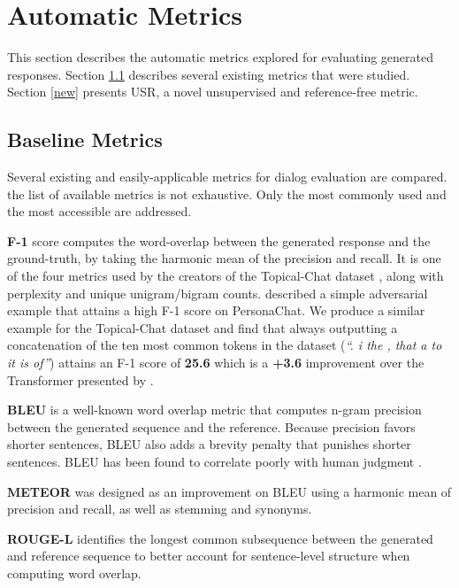 \documentclass[11pt,a4paper]{article}
\begin{document}
\section{Automatic Metrics}
\label{am}
This section describes the automatic metrics explored for evaluating generated responses. Section \ref{baseline} describes several existing metrics that were studied. Section \ref{new} presents USR, a novel unsupervised and reference-free metric. 
\subsection{Baseline Metrics}
\label{baseline}

Several existing and easily-applicable metrics for dialog evaluation are compared. the list of available metrics is not exhaustive. Only the most commonly used and the most accessible are addressed.

\textbf{F-1} score computes the word-overlap between the generated response and the ground-truth, by taking the harmonic mean of the precision and recall. It is one of the four metrics used by the creators of the Topical-Chat dataset \citep{gopalakrishnan2019topical}, along with perplexity and unique unigram/bigram counts. \citet{dinan2019second} described a simple adversarial example that attains a high F-1 score on PersonaChat. We produce a similar example for the Topical-Chat dataset and find that always outputting a concatenation of the ten most common tokens in the dataset (\textit{``. i the , that a to it is of''}) attains an F-1 score of \textbf{25.6} which is a \textbf{+3.6} improvement over the Transformer presented by \citet{gopalakrishnan2019topical}.

\textbf{BLEU} \citep{papineni2002bleu} is a well-known word overlap metric that computes n-gram precision between the generated sequence and the reference. Because precision favors shorter sentences, BLEU also adds a brevity penalty that punishes shorter sentences. BLEU has been found to correlate poorly with human judgment \citep{liu2016not,lowe-etal-2017-towards,gupta2019investigating}.

\textbf{METEOR} \citep{denkowski2014meteor} was designed as an improvement on BLEU using a harmonic mean of precision and recall, as well as stemming and synonyms.  

\textbf{ROUGE-L} \citep{lin2004rouge} identifies the longest common subsequence between the generated and reference sequence to better account for sentence-level structure when computing word overlap.
\end{document}
